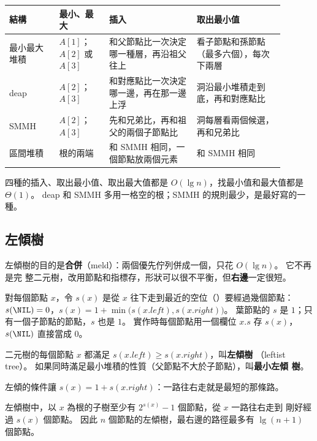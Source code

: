 \begin{center}
\small
\begin{tabular}{>{\raggedright\arraybackslash}p{0.16\linewidth}>{\raggedright\arraybackslash}p{0.16\linewidth}>{\raggedright\arraybackslash}p{0.28\linewidth}>{\raggedright\arraybackslash}p{0.29\linewidth}}
\toprule
結構 & 最小、最大 & 插入 & 取出最小值 \\
\midrule
最小最大堆積 & $A[1]$；$A[2]$ 或 $A[3]$ & 和父節點比一次決定哪一種層，再沿祖父往上 &
看子節點和孫節點（最多六個），每次下兩層 \\
deap & $A[2]$；$A[3]$ & 和對應點比一次決定哪一邊，再在那一邊上浮 &
洞沿最小堆積走到底，再和對應點比 \\
SMMH & $A[2]$；$A[3]$ & 先和兄弟比，再和祖父的兩個子節點比 &
洞每層看兩個候選，再和兄弟比 \\
區間堆積 & 根的兩端 & 和 SMMH 相同，一個節點放兩個元素 & 和 SMMH 相同 \\
\bottomrule
\end{tabular}
\end{center}

四種的插入、取出最小值、取出最大值都是 $O(\lg n)$，找最小值和最大值都是 $\Theta(1)$。 deap 和
SMMH 多用一格空的根；SMMH 的規則最少，是最好寫的一種。

\subsection{左傾樹}

左傾樹的目的是\textbf{合併}（meld）：兩個優先佇列併成一個，只花 $O(\lg n)$。 它不再是完
整二元樹，改用節點和指標存，形狀可以很不平衡，但\textbf{右邊}一定很短。

對每個節點 $x$，令 $s(x)$ 是從 $x$ 往下走到最近的空位（\NIL）要經過幾個節點：
$s(\NIL) = 0$，$s(x) = 1 + \min\bigl(s(x.\mathit{left}), s(x.\mathit{right})\bigr)$。 葉節點的
$s$ 是 $1$；只有一個子節點的節點，$s$ 也是 $1$。 實作時每個節點用一個欄位 $x.s$ 存
$s(x)$，$s(\NIL)$ 直接當成 $0$。

\begin{definition}[左傾樹]
\label{def:hp-leftist}
二元樹的每個節點 $x$ 都滿足 $s(x.\mathit{left}) \ge s(x.\mathit{right})$，叫\textbf{左傾樹}
（leftist tree）。 如果同時滿足最小堆積的性質（父節點不大於子節點），叫\textbf{最小左傾
樹}。
\end{definition}

左傾的條件讓 $s(x) = 1 + s(x.\mathit{right})$：一路往右走就是最短的那條路。

\begin{theorem}
\label{thm:hp-leftist}
左傾樹中，以 $x$ 為根的子樹至少有 $2^{s(x)} - 1$ 個節點，從 $x$ 一路往右走到 \NIL 剛好經
過 $s(x)$ 個節點。 因此 $n$ 個節點的左傾樹，最右邊的路徑最多有 $\lg(n + 1)$ 個節點。
\end{theorem}

